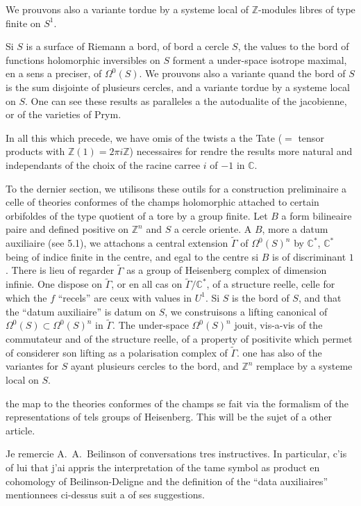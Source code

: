 \documentclass[12pt,a4paper]{article}
\theoremstyle{plain}
\theoremstyle{definition}
\theoremstyle{remark}
\newcommand{\Z}{\mathbb{Z}}
\newcommand{\C}{\mathbb{C}}
\begin{document}
We prouvons also a variante tordue by a systeme local of $\Z$-modules libres of
type finite on $S^1$.

Si $S$ is a surface of Riemann a bord, of bord a cercle $S$, the values to the bord
of functions holomorphic inversibles on $S$ forment a under-space isotrope maximal,
en a sens a preciser, of $\Omega^0(S)$. We prouvons also a variante quand the bord of $S$
is the sum disjointe of plusieurs cercles, and a variante tordue by a systeme local
on $S$. One can see these results as paralleles a the autodualite of the jacobienne,
or of the varieties of Prym.

In all this which precede, we have omis of the twists a the Tate ($= {}$ tensor products
with $\Z(1) = 2\pi i\Z$) necessaires for rendre the results more natural and independants
of the choix of the racine carree $i$ of $-1$ in $\C$.

To the dernier section, we utilisons these outils for a construction preliminaire
a celle of theories conformes of the champs holomorphic attached to certain orbifoldes
of the type quotient of a tore by a group finite. Let $B$ a form bilineaire paire and
defined positive on $\Z^n$ and $S$ a cercle oriente. A $B$, more a datum auxiliaire (see 5.1),
we attachons a central extension $\tilde{\Gamma}$ of $\Omega^0(S)^n$ by $\C^*$, $\C^*$ being of indice finite in
the centre, and egal to the centre si $B$ is of discriminant $1$. There is lieu of regarder $\tilde{\Gamma}$ as
a group of Heisenberg complex of dimension infinie. One dispose on $\tilde{\Gamma}$, or en all
cas on $\tilde{\Gamma}/\C^*$, of a structure reelle, celle for which the $f$ ``recels'' are ceux with values in $U^1$. Si $S$ is the bord of $S$, and that the ``datum auxiliaire'' is datum on $S$, we
construisons a lifting canonical of $\Omega^0(S) \subset \Omega^0(S)^n$ in $\tilde{\Gamma}$. The under-space
$\Omega^0(S)^n$ jouit, vis-a-vis of the commutateur and of the structure reelle, of a property of positivite which permet of considerer son lifting as a polarisation complex of $\tilde{\Gamma}$.
one has also of the variantes for $S$ ayant plusieurs cercles to the bord, and $\Z^n$ remplace by a
systeme local on $S$.

the map to the theories conformes of the champs se fait via the formalism of the representations of tels groups of Heisenberg. This will be the sujet of a other article.

Je remercie A.~A.~Beilinson of conversations tres instructives. In particular, c'is
of lui that j'ai appris the interpretation of the tame symbol as product en cohomology
of Beilinson-Deligne and the definition of the ``data auxiliaires'' mentionnees ci-dessus suit
a of ses suggestions.
\end{document}
